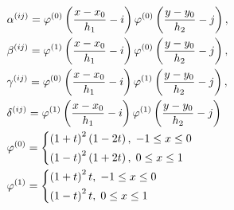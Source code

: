 \documentclass[fleqn, bachelor,subf,12pt,notitlepage]{article}
\begin{document}
\begin{equation}
\begin{aligned}
&\alpha^{(ij)} = \varphi^{(0)}\left(\dfrac{x-x_{0}}{h_{1}}-i\right) \varphi^{(0)}\left(\dfrac{y-y_{0}}{h_{2}}-j\right), \\
&\beta^{(ij)} = \varphi^{(1)}\left(\dfrac{x-x_{0}}{h_{1}}-i\right) \varphi^{(0)}\left(\dfrac{y-y_{0}}{h_{2}}-j\right), \\
&\gamma^{(ij)} = \varphi^{(0)}\left(\dfrac{x-x_{0}}{h_{1}}-i\right) \varphi^{(1)}\left(\dfrac{y-y_{0}}{h_{2}}-j\right), \\
&\delta^{(ij)} = \varphi^{(1)}\left(\dfrac{x-x_{0}}{h_{1}}-i\right) \varphi^{(1)}\left(\dfrac{y-y_{0}}{h_{2}}-j\right)\\
&\varphi^{(0)}=\begin{dcases}
\left(1+t\right)^{2}\left(1-2t\right), \; -1\leq x \leq 0 \\
\left(1-t\right)^{2}\left(1+2t\right), \; 0\leq  x \leq  1 \\
\end{dcases}
\\
&\varphi^{(1)}=\begin{dcases}
\left(1+t\right)^{2}t, \; -1\leq  x \leq 0 \\
\left(1-t\right)^{2}t, \; 0\leq  x \leq 1 \\
\end{dcases}
\end{aligned}
\end{equation}
\end{document}
